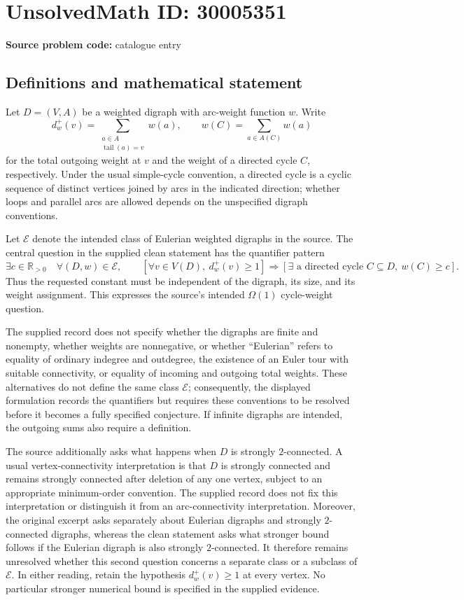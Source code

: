 \documentclass[11pt]{article}
\newcommand{\R}{\mathbb{R}}
\begin{document}
\section*{UnsolvedMath ID: 30005351}
\textbf{Source problem code:} catalogue entry
\subsection{Definitions and mathematical statement}
Let \(D=(V,A)\) be a weighted digraph with arc-weight function \(w\). Write
\[
 d_w^+(v)=\sum_{\substack{a\in A\\\operatorname{tail}(a)=v}}w(a),
 \qquad
 w(C)=\sum_{a\in A(C)}w(a)
\]
for the total outgoing weight at \(v\) and the weight of a directed cycle \(C\), respectively. Under the usual simple-cycle convention, a directed cycle is a cyclic sequence of distinct vertices joined by arcs in the indicated direction; whether loops and parallel arcs are allowed depends on the unspecified digraph conventions.

Let \(\mathcal E\) denote the intended class of Eulerian weighted digraphs in the source. The central question in the supplied clean statement has the quantifier pattern
\[
 \exists c\in\R_{>0}\quad
 \forall (D,w)\in\mathcal E,\qquad
 \left[\forall v\in V(D),\ d_w^+(v)\ge 1\right]
 \Longrightarrow
 \left[\exists\text{ a directed cycle }C\subseteq D,\ w(C)\ge c\right].
\]
Thus the requested constant must be independent of the digraph, its size, and its weight assignment. This expresses the source's intended \(\Omega(1)\) cycle-weight question.

The supplied record does not specify whether the digraphs are finite and nonempty, whether weights are nonnegative, or whether ``Eulerian'' refers to equality of ordinary indegree and outdegree, the existence of an Euler tour with suitable connectivity, or equality of incoming and outgoing total weights. These alternatives do not define the same class \(\mathcal E\); consequently, the displayed formulation records the quantifiers but requires these conventions to be resolved before it becomes a fully specified conjecture. If infinite digraphs are intended, the outgoing sums also require a definition.

The source additionally asks what happens when \(D\) is strongly \(2\)-connected. A usual vertex-connectivity interpretation is that \(D\) is strongly connected and remains strongly connected after deletion of any one vertex, subject to an appropriate minimum-order convention. The supplied record does not fix this interpretation or distinguish it from an arc-connectivity interpretation. Moreover, the original excerpt asks separately about Eulerian digraphs and strongly \(2\)-connected digraphs, whereas the clean statement asks what stronger bound follows if the Eulerian digraph is also strongly \(2\)-connected. It therefore remains unresolved whether this second question concerns a separate class or a subclass of \(\mathcal E\). In either reading, retain the hypothesis \(d_w^+(v)\ge1\) at every vertex. No particular stronger numerical bound is specified in the supplied evidence.
\end{document}
